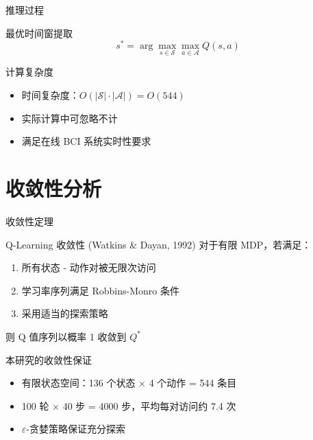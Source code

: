 \begin{frame}{推理过程}
    \begin{block}{最优时间窗提取}
        \[
        s^* = \arg\max_{s \in \mathcal{S}} \max_{a \in \mathcal{A}} Q(s, a)
        \]
    \end{block}
    
    \vspace{0.3cm}
    \begin{exampleblock}{计算复杂度}
        \begin{itemize}
            \item 时间复杂度：$O(|\mathcal{S}| \cdot |\mathcal{A}|) = O(544)$
            \item 实际计算中可忽略不计
            \item 满足在线 BCI 系统实时性要求
        \end{itemize}
    \end{exampleblock}
\end{frame}

\section{收敛性分析}

\begin{frame}{收敛性定理}
    \begin{block}{Q-Learning 收敛性 (Watkins \& Dayan, 1992)}
        对于有限 MDP，若满足：
        \begin{enumerate}
            \item 所有状态 - 动作对被无限次访问
            \item 学习率序列满足 Robbins-Monro 条件
            \item 采用适当的探索策略
        \end{enumerate}
        则 Q 值序列以概率 1 收敛到 $Q^*$
    \end{block}
    
    \vspace{0.3cm}
    \begin{alertblock}{本研究的收敛性保证}
        \begin{itemize}
            \item 有限状态空间：136 个状态 × 4 个动作 = 544 条目
            \item 100 轮 × 40 步 = 4000 步，平均每对访问约 7.4 次
            \item $\varepsilon$-贪婪策略保证充分探索
        \end{itemize}
    \end{alertblock}
\end{frame}

